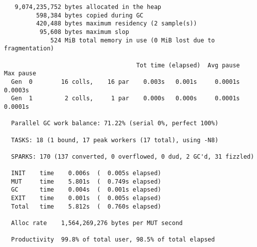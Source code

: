 \begin{verbatim}
   9,074,235,752 bytes allocated in the heap
         598,384 bytes copied during GC
         420,488 bytes maximum residency (2 sample(s))
          95,608 bytes maximum slop
             524 MiB total memory in use (0 MiB lost due to fragmentation)

                                     Tot time (elapsed)  Avg pause  Max pause
  Gen  0        16 colls,    16 par    0.003s   0.001s     0.0001s    0.0003s
  Gen  1         2 colls,     1 par    0.000s   0.000s     0.0001s    0.0001s

  Parallel GC work balance: 71.22% (serial 0%, perfect 100%)

  TASKS: 18 (1 bound, 17 peak workers (17 total), using -N8)

  SPARKS: 170 (137 converted, 0 overflowed, 0 dud, 2 GC'd, 31 fizzled)

  INIT    time    0.006s  (  0.005s elapsed)
  MUT     time    5.801s  (  0.749s elapsed)
  GC      time    0.004s  (  0.001s elapsed)
  EXIT    time    0.001s  (  0.005s elapsed)
  Total   time    5.812s  (  0.760s elapsed)

  Alloc rate    1,564,269,276 bytes per MUT second

  Productivity  99.8% of total user, 98.5% of total elapsed
\end{verbatim}
